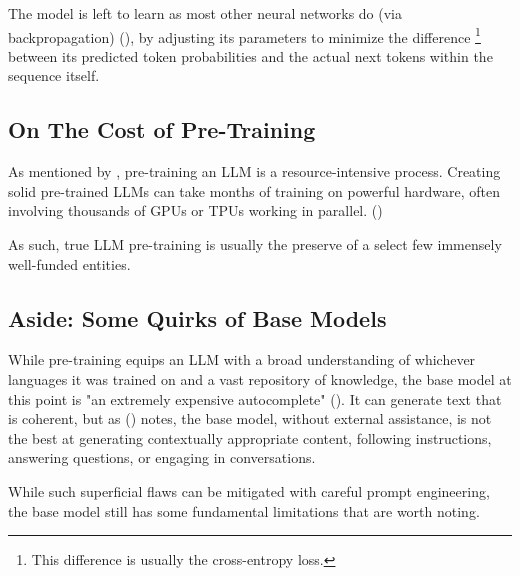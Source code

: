 \documentclass{article} %
\begin{document}
The model is left to learn as most other neural networks do (via backpropagation) (\cite{Karpathy-2025}),
by adjusting its parameters to minimize the difference \footnote{
    This difference is usually the cross-entropy loss.
} between its predicted token probabilities and the actual next tokens
within the sequence itself.

\subsection{On The Cost of Pre-Training}
As mentioned by \cite{Karpathy-2025}, pre-training an LLM is a resource-intensive process.
Creating solid pre-trained LLMs can take months of training on powerful hardware,
often involving thousands of GPUs or TPUs working in parallel. (\cite{Alibaba-2025,Anthropic-2025,ChatGPT-2022,Deepseek-2024,Google-2025,Meta-2023})

As such, true LLM pre-training is usually the preserve of a select few immensely well-funded entities.

\subsection{Aside: Some Quirks of Base Models}
While pre-training equips an LLM with a broad understanding of whichever languages it was trained on
and a vast repository of knowledge, the base model at this point is "an extremely expensive autocomplete" (\cite{Karpathy-2025}).
It can generate text that is coherent, but as (\cite{Karpathy-2025}) notes, 
the base model, without external assistance, is not the best at generating contextually appropriate content,
following instructions, answering questions, or engaging in conversations.

While such superficial flaws can be mitigated with careful prompt engineering,
the base model still has some fundamental limitations that are worth noting.
\end{document}
